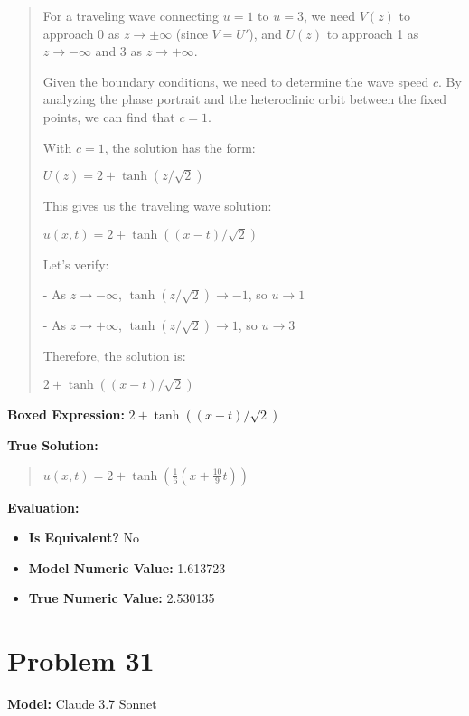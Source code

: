 \documentclass{article}
\begin{document}
\begin{quote}
For a traveling wave connecting $u=1$ to $u=3$, we need $V(z)$ to approach 0 as $z \to \pm\infty$ (since $V = U'$), and $U(z)$ to approach 1 as $z \to -\infty$ and 3 as $z \to +\infty$.



Given the boundary conditions, we need to determine the wave speed $c$. By analyzing the phase portrait and the heteroclinic orbit between the fixed points, we can find that $c = 1$.



With $c = 1$, the solution has the form:

$U(z) = 2 + \tanh(z/\sqrt{2})$



This gives us the traveling wave solution:

$u(x,t) = 2 + \tanh((x-t)/\sqrt{2})$



Let's verify: 

- As $z \to -\infty$, $\tanh(z/\sqrt{2}) \to -1$, so $u \to 1$

- As $z \to +\infty$, $\tanh(z/\sqrt{2}) \to 1$, so $u \to 3$



Therefore, the solution is:



$\boxed{2 + \tanh((x-t)/\sqrt{2})}$
\end{quote}
\textbf{Boxed Expression:} $2 + \tanh((x-t)/\sqrt{2})$

\textbf{True Solution:}
\begin{quote}
$u(x,t) = 2+\tanh(\frac{1}{6}(x+\frac{10}{9}t))$
\end{quote}

\textbf{Evaluation:}
\begin{itemize}
\item \textbf{Is Equivalent?} No
\item \textbf{Model Numeric Value:} 1.613723
\item \textbf{True Numeric Value:} 2.530135
\end{itemize}
\vspace{1cm}
\section*{Problem 31}
\textbf{Model:} Claude 3.7 Sonnet
\end{document}
